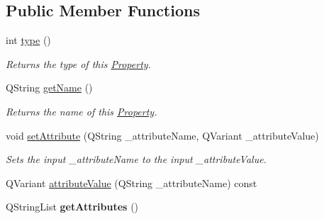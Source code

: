 \subsection*{Public Member Functions}
\begin{DoxyCompactItemize}
\item 
int \hyperlink{class_picto_1_1_property_a0b2715a51a50a94a0c1447597ecd00dd}{type} ()
\begin{DoxyCompactList}\small\item\em Returns the type of this \hyperlink{class_picto_1_1_property}{Property}. \end{DoxyCompactList}\item 
Q\-String \hyperlink{class_picto_1_1_property_ade246730c24535192f5c0376b85e6581}{get\-Name} ()
\begin{DoxyCompactList}\small\item\em Returns the name of this \hyperlink{class_picto_1_1_property}{Property}. \end{DoxyCompactList}\item 
void \hyperlink{class_picto_1_1_property_ac70060568119a4c00e23c03a0bc81f41}{set\-Attribute} (Q\-String \-\_\-attribute\-Name, Q\-Variant \-\_\-attribute\-Value)
\begin{DoxyCompactList}\small\item\em Sets the input \-\_\-attribute\-Name to the input \-\_\-attribute\-Value. \end{DoxyCompactList}\item 
Q\-Variant \hyperlink{class_picto_1_1_property_aab81c42dffb16e8729aa4ba98694c944}{attribute\-Value} (Q\-String \-\_\-attribute\-Name) const 
\item 
\hypertarget{class_picto_1_1_property_a0114121a1ffd6a3e9e59047dbc3d9948}{Q\-String\-List {\bfseries get\-Attributes} ()}\label{class_picto_1_1_property_a0114121a1ffd6a3e9e59047dbc3d9948}


\end{DoxyCompactItemize}
